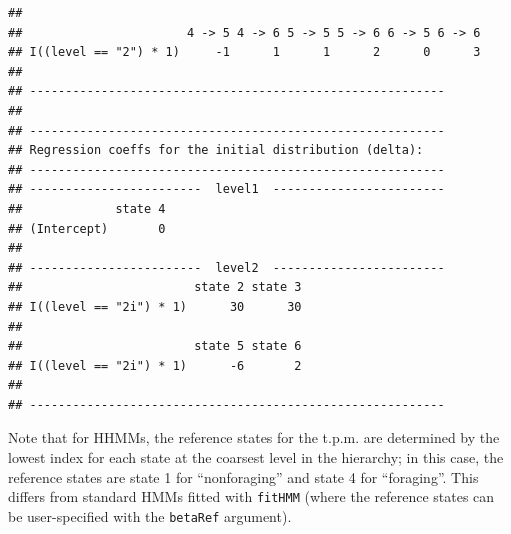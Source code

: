 \documentclass[12pt]{article}\usepackage[]{graphicx}\usepackage[]{xcolor}
\makeatletter
\newenvironment{kframe}{%
 \def\at@end@of@kframe{}%
 \ifinner\ifhmode%
  \def\at@end@of@kframe{\end{minipage}}%
  \begin{minipage}{\columnwidth}%
 \fi\fi%
 \def\FrameCommand##1{\hskip\@totalleftmargin \hskip-\fboxsep
 \colorbox{shadecolor}{##1}\hskip-\fboxsep
     \hskip-\linewidth \hskip-\@totalleftmargin \hskip\columnwidth}%
 \MakeFramed {\advance\hsize-\width
   \@totalleftmargin\z@ \linewidth\hsize
   \@setminipage}}%
 {\par\unskip\endMakeFramed%
 \at@end@of@kframe}
\newenvironment{knitrout}{}{} %
\makeatother
\begin{document}
\begin{knitrout}
\begin{kframe}
\begin{verbatim}
## 
##                       4 -> 5 4 -> 6 5 -> 5 5 -> 6 6 -> 5 6 -> 6
## I((level == "2") * 1)     -1      1      1      2      0      3
## 
## ----------------------------------------------------------
## 
## ----------------------------------------------------------
## Regression coeffs for the initial distribution (delta):
## ----------------------------------------------------------
## ------------------------  level1  ------------------------
##             state 4
## (Intercept)       0
## 
## ------------------------  level2  ------------------------
##                        state 2 state 3
## I((level == "2i") * 1)      30      30
## 
##                        state 5 state 6
## I((level == "2i") * 1)      -6       2
## 
## ----------------------------------------------------------
\end{verbatim}
\end{kframe}
\end{knitrout}
\noindent Note that for HHMMs, the reference states for the t.p.m. are determined by the lowest index for each state at the coarsest level in the hierarchy; in this case, the reference states are state 1 for ``nonforaging'' and state 4 for ``foraging''. This differs from standard HMMs fitted with \verb|fitHMM| (where the reference states can be user-specified with the \verb|betaRef| argument).  
\end{document}

